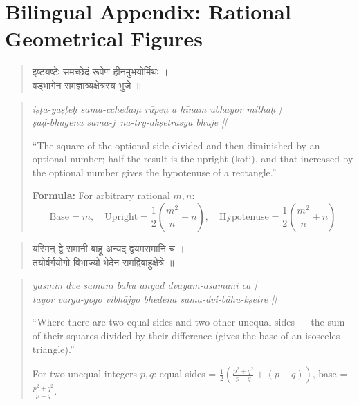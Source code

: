 \documentclass[11pt,a4paper]{article}
\newcommand{\dev}[1]{{\devanagarifont #1}}
\theoremstyle{definition}
\begin{document}
\vspace{0.8cm}

\section*{Bilingual Appendix: Rational Geometrical Figures}



\noindent
\begin{quote}
\dev{इष्टयष्टेः समच्छेदं रूपेण हीनमुभयोर्मिथः ।\\
षड्भागेन समज्ञात्र्यक्षेत्रस्य भुजे ॥}
\end{quote}

\hfill\noindent
\begin{quote}
\textit{i\d{s}\d{t}a-ya\d{s}\d{t}e\d{h} sama-ccheda\d{m} r\=upe\d{n} a h\={i}nam ubhayor mitha\d{h} |\\
\d{s}a\d{d}-bh\=agena sama-j~n\=a-try-ak\d{s}etrasya bhuje ||}

``The square of the optional side divided and then diminished by an optional number; half the result is the upright (koti), and that increased by the optional number gives the hypotenuse of a rectangle.''

\textbf{Formula:} For arbitrary rational $m, n$:
\[
\text{Base} = m, \quad \text{Upright} = \frac{1}{2}\!\left(\frac{m^2}{n} - n\right), \quad \text{Hypotenuse} = \frac{1}{2}\!\left(\frac{m^2}{n} + n\right)
\]
\end{quote}



\vspace{0.3cm}



\noindent
\begin{quote}
\dev{यस्मिन् द्वे समानी बाहू अन्यद् द्वयमसमानि च ।\\
तयोर्वर्गयोगो विभाज्यो भेदेन समद्विबाहुक्षेत्रे ॥}
\end{quote}

\hfill\noindent
\begin{quote}
\textit{yasmin dve sam\=an\={i} b\=ah\=u anyad dvayam-asam\=ani ca |\\
tayor varga-yogo vibh\=ajyo bhedena sama-dvi-b\=ahu-k\d{s}etre ||}

``Where there are two equal sides and two other unequal sides --- the sum of their squares divided by their difference (gives the base of an isosceles triangle).''

For two unequal integers $p, q$: equal sides = $\frac{1}{2}\!\left(\frac{p^2+q^2}{p-q} + (p-q)\right)$, base = $\frac{p^2+q^2}{p-q}$.
\end{quote}
\end{document}
